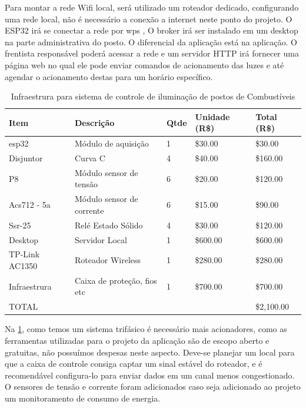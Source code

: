 Para montar a rede Wifi local, será utilizado um roteador dedicado, configurando uma rede local, não é necessário a conexão a internet neste ponto do projeto. O ESP32 irá se conectar a rede por wps \cite{linksys}, O broker irá ser instalado em um desktop na parte administrativa do posto. O diferencial da aplicação está na aplicação. O frentista responsável poderá acessar a rede e um servidor HTTP irá fornecer uma página web no qual ele pode enviar comandos de acionamento das luzes e até agendar o acionamento destas para um horário específico.


\begin{table}[h]
\caption{Infraestrura para sistema de controle de iluminação de  postos de Combustíveis}
\begin{tabular}{|l|l|l|l|l|}
\hline
Item           & Descrição                   & Qtde & Unidade (R\$) & Total (R\$) \\ \hline
esp32          & Módulo de aquisição         & 1    & \$30.00       & \$30.00     \\ \hline
Disjuntor      & Curva C                     & 4    & \$40.00       & \$160.00    \\ \hline
P8             & Módulo sensor de tensão     & 6    & \$20.00       & \$120.00    \\ \hline
Acs712 - 5a    & Módulo sensor de corrente   & 6    & \$15.00       & \$90.00     \\ \hline
Ssr-25         & Relé Estado Sólido          & 4    & \$30.00       & \$120.00    \\ \hline
Desktop        & Servidor Local              & 1    & \$600.00      & \$600.00    \\ \hline
TP-Link AC1350 & Roteador Wireless           & 1    & \$280.00      & \$280.00    \\ \hline
Infraestrura   & Caixa de proteção, fios etc & 1    & \$700.00      & \$700.00    \\ \hline
\multicolumn{4}{|l|}{TOTAL}                                         & \$2,100.00  \\ \hline
\end{tabular}
\label{table:posto}
\end{table}		

Na \ref{table:posto}, como temos um sistema trifásico é necessário mais acionadores, como  as ferramentas utilizadas para o projeto da aplicação são de escopo aberto e gratuitas, não possuímos despesas neste aspecto. Deve-se planejar um local para que a caixa de controle consiga captar um sinal estável do roteador, e é recomendável configura-lo para enviar dados em um canal menos congestionado. O sensores de tensão e corrente foram adicionados caso seja adicionado ao projeto um monitoramento de consumo de energia.